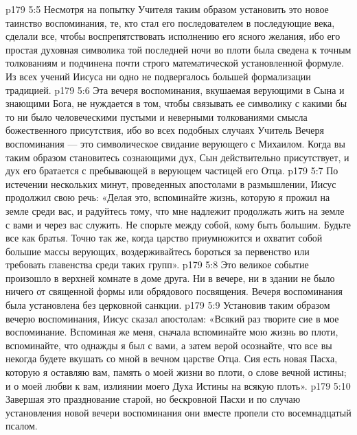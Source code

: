 \vs p179 5:5 Несмотря на попытку Учителя таким образом установить это новое таинство воспоминания, те, кто стал его последователем в последующие века, сделали все, чтобы воспрепятствовать исполнению его ясного желания, ибо его простая духовная символика той последней ночи во плоти была сведена к точным толкованиям и подчинена почти строго математической установленной формуле. Из всех учений Иисуса ни одно не подвергалось большей формализации традицией.
\vs p179 5:6 Эта вечеря воспоминания, вкушаемая верующими в Сына и знающими Бога, не нуждается в том, чтобы связывать ее символику с какими бы то ни было человеческими пустыми и неверными толкованиями смысла божественного присутствия, ибо во всех подобных случаях Учитель  Вечеря воспоминания --- это символическое свидание верующего с Михаилом. Когда вы таким образом становитесь сознающими дух, Сын действительно присутствует, и дух его братается с пребывающей в верующем частицей его Отца.
\vs p179 5:7 \pc По истечении нескольких минут, проведенных апостолами в размышлении, Иисус продолжил свою речь: «Делая это, вспоминайте жизнь, которую я прожил на земле среди вас, и радуйтесь тому, что мне надлежит продолжать жить на земле с вами и через вас служить. Не спорьте между собой, кому быть большим. Будьте все как братья. Точно так же, когда царство приумножится и охватит собой большие массы верующих, воздерживайтесь бороться за первенство или требовать главенства среди таких групп».
\vs p179 5:8 Это великое событие произошло в верхней комнате в доме друга. Ни в вечере, ни в здании не было ничего от священной формы или обрядового посвящения. Вечеря воспоминания была установлена без церковной санкции.
\vs p179 5:9 Установив таким образом вечерю воспоминания, Иисус сказал апостолам: «Всякий раз творите сие в мое воспоминание. Вспоминая же меня, сначала вспоминайте мою жизнь во плоти, вспоминайте, что однажды я был с вами, а затем верой осознайте, что все вы некогда будете вкушать со мной в вечном царстве Отца. Сия есть новая Пасха, которую я оставляю вам, память о моей жизни во плоти, о слове вечной истины; и о моей любви к вам, излиянии моего Духа Истины на всякую плоть».
\vs p179 5:10 Завершая это празднование старой, но бескровной Пасхи и по случаю установления новой вечери воспоминания они вместе пропели сто восемнадцатый псалом.
